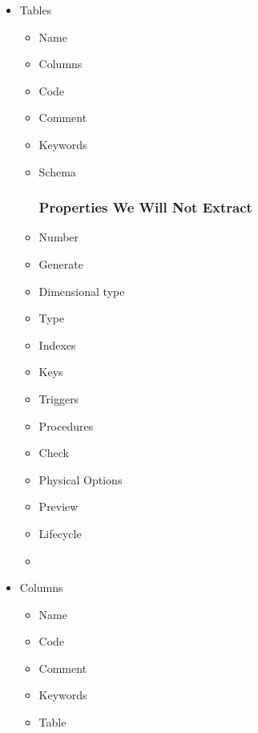 \begin{itemize}
	\item Tables
	\begin{itemize}
		\item Name 
		\item Columns
		\item Code 
		\item Comment
		\item Keywords
		\item Schema
		\subsubsection{Properties We Will Not Extract}
		\item Number
		\item Generate
		\item Dimensional type
		\item Type
		\item Indexes
		\item Keys 
		\item Triggers
		\item Procedures
		\item Check 
		\item Physical Options
		\item Preview
		\item Lifecycle 
		\item {}
	\end{itemize}
	\item Columns
	\begin{itemize}
		\item Name 
		\item Code 
		\item Comment
		\item Keywords
		\item Table

\end{itemize}
\end{itemize}
